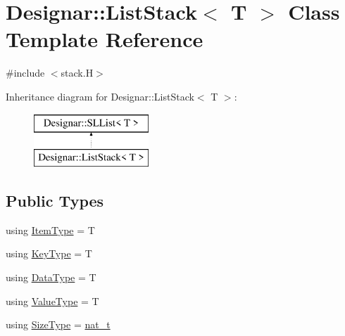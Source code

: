 \hypertarget{class_designar_1_1_list_stack}{}\section{Designar\+:\+:List\+Stack$<$ T $>$ Class Template Reference}
\label{class_designar_1_1_list_stack}


{\ttfamily \#include $<$stack.\+H$>$}

Inheritance diagram for Designar\+:\+:List\+Stack$<$ T $>$\+:\begin{figure}[H]
\begin{center}
\leavevmode
\includegraphics[height=2.000000cm]{class_designar_1_1_list_stack}
\end{center}
\end{figure}
\subsection*{Public Types}
\begin{DoxyCompactItemize}
\item 
using \hyperlink{class_designar_1_1_list_stack_a5a584752d4cfca9e791071f1553d7c69}{Item\+Type} = T
\item 
using \hyperlink{class_designar_1_1_list_stack_adf88da10e96a685fa2cdd3fff029d52c}{Key\+Type} = T
\item 
using \hyperlink{class_designar_1_1_list_stack_a9bdd8f2e28bca0397b835faa08a1d0dc}{Data\+Type} = T
\item 
using \hyperlink{class_designar_1_1_list_stack_ac51dd165958a3e9ff0790e9f5791a4a5}{Value\+Type} = T
\item 
using \hyperlink{class_designar_1_1_list_stack_ae1849f2d4064bd8602122eb9db436441}{Size\+Type} = \hyperlink{namespace_designar_aa72662848b9f4815e7bf31a7cf3e33d1}{nat\+\_\+t}
\end{DoxyCompactItemize}
